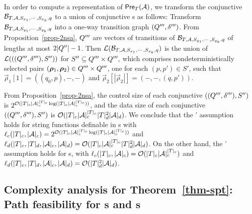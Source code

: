 In order to compute a representation of $\textsf{Pre}_{T}(\mathcal{A})$, we transform the conjunctive \SSA{} $\mathcal{B}_{T, \mathcal{A}, S_{x_1}, \cdots, S_{x_k},q}$ to a union of conjunctive \SA{}s as follows: Transform $\mathcal{B}_{T, \mathcal{A}, S_{y_1}, \cdots, S_{y_k}, q}$ into a one-way transition graph $(Q''',\delta''')$. From Proposition~\ref{prop-2nsa}, $Q'''$ are vectors of transitions of $\mathcal{B}_{T, \mathcal{A}, S_{y_1}, \cdots, S_{y_k}, q}$ of lengths at most $2|Q''|-1$. Then $\mathcal{L}(\mathcal{B}_{T, \mathcal{A}, S_{x_1}, \cdots, S_{x_k},q})$ is the union of $\mathcal{L}(((Q''',\delta'''), S''))$ for $S'' \subseteq Q''' \times Q''',$ which comprises nondeterministically selected pairs $(\vec{\rho}_1, \vec{\rho}_2) \in \controls''' \times \controls'''$, one for each $(p, p') \in S'$, such that $\vec{\rho}_1[1] = ((q_0, p), -, -)$ and  $\vec{\rho}_2[|\vec{\rho}_2|] = (-, -, (q, p'))$.

From Proposition~\ref{prop-2nsa}, 
the control size of each conjunctive \SA{} $((Q''',\delta'''), S'')$ is 
$ 2^{\mathcal{O}( |T|_c |\mathcal{A}|_c^{|T|_c} \log (|T|_c |\mathcal{A}|_c^{|T|_c}))}$, 
and the data size of  each conjunctive \SA{} $((Q''',\delta'''), S'')$ is 
$ \mathcal{O}( |T|_c |\mathcal{A}|_c^{|T|_c} |T|^2_d |\mathcal{A}|_d )$. 
We conclude that 
the \prerec{}' assumption holds for string functions definable in \SSPT{}s with $\ell_c(|T|_c, |\mathcal{A}|_c) = 2^{\mathcal{O}( |T|_c |\mathcal{A}|_c^{|T|_c} \log (|T|_c |\mathcal{A}|_c^{|T|_c}))}$ and $\ell_d(|T|_c, |T|_d, |\mathcal{A}|_c, |\mathcal{A}|_d) = \mathcal{O}(|T|_c |\mathcal{A}|_c^{|T|_c} |T|^2_d |\mathcal{A}|_d)$.
On the other hand, the \prerec' assumption holds for \SPT{}s, with $\ell_c(|T|_c, |\mathcal{A}|_c) = \mathcal{O}(|T|_c |\mathcal{A}|_c^{|T|_c})$ and  $\ell_d(|T|_c, |T|_d, |\mathcal{A}|_c, |\mathcal{A}|_d) = \mathcal{O}(|T|^2_d |\mathcal{A}|_d)$.


\subsection{Complexity analysis for Theorem~\ref{thm-spt}: Path feasibility for \SSPT{}s and \SPT{}s}

